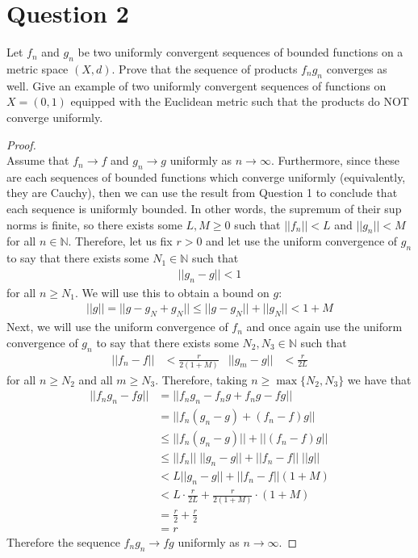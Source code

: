 \documentclass[10pt,a4paper]{article}
\theoremstyle{definition}
\theoremstyle{definition}
\numberwithin{equation}{section}
\begin{document}
\section*{Question 2}
Let $f_n$ and $g_n$ be two uniformly convergent sequences of bounded functions on a metric space $(X, d)$. Prove that the sequence of products $f_n g_n$ converges as well. Give an example of two uniformly convergent sequences of functions on $X = (0, 1)$ equipped with the Euclidean metric such that the products do NOT converge uniformly. 

\begin{proof}$ $
\\Assume that $f_n \to f$ and $g_n \to g$ uniformly as $n \to \infty$. Furthermore, since these are each sequences of bounded functions which converge uniformly (equivalently, they are Cauchy), then we can use the result from Question 1 to conclude that each sequence is uniformly bounded. In other words, the supremum of their sup norms is finite, so there exists some $L, M \geq 0$ such that $||f_n|| < L$ and $||g_n|| < M$ for all $n \in \mathbb{N}$. Therefore, let us fix $r > 0$ and let use the uniform convergence of $g_n$ to say that there exists some $N_1 \in \mathbb{N}$ such that 
\begin{align*}
||g_n - g|| < 1
\end{align*}
for all $n \geq N_1$. We will use this to obtain a bound on $g$:
\begin{align*}
||g|| = ||g - g_N + g_N|| \leq ||g - g_N|| + ||g_N|| < 1 + M
\end{align*}
Next, we will use the uniform convergence of $f_n$ and once again use the uniform convergence of $g_n$ to say that there exists some $N_2, N_3 \in \mathbb{N}$ such that
\begin{align*}
||f_n - f|| &< \frac{r}{2(1 + M)} & ||g_m - g|| &< \frac{r}{2L}
\end{align*}
for all $n \geq N_2$ and all $m \geq N_3$. Therefore, taking $n \geq \max\{N_2, N_3\}$ we have that
\begin{align*}
||f_ng_n - fg|| &= ||f_ng_n - f_ng + f_ng - fg||\\
&= ||f_n(g_n - g) + (f_n - f)g||\\
&\leq ||f_n(g_n - g)|| + ||(f_n - f)g||\\
&\leq ||f_n|| \; ||g_n - g|| + ||f_n - f|| \; ||g||\\
&< L ||g_n - g|| + ||f_n - f||(1 + M)\\
&< L \cdot \frac{r}{2L} + \frac{r}{2(1 + M)} \cdot (1 + M)\\
&= \frac{r}{2} + \frac{r}{2}\\
&= r
\end{align*}
Therefore the sequence $f_ng_n \to fg$ uniformly as $n \to \infty$. 
\end{proof}
\end{document}

